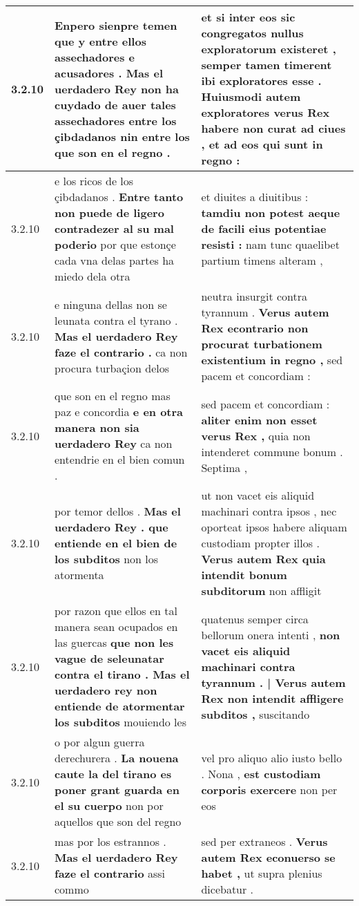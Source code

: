 \begin{tabular}{|p{1cm}|p{6.5cm}|p{6.5cm}|}
3.2.10 & Enpero sienpre temen que y entre ellos assechadores e acusadores . \textbf{ Mas el uerdadero Rey non ha cuydado de auer tales assechadores entre los çibdadanos } nin entre los que son en el regno . & et si inter eos sic congregatos nullus exploratorum existeret , \textbf{ semper tamen timerent ibi exploratores esse . Huiusmodi autem exploratores verus Rex habere non curat ad ciues , } et ad eos qui sunt in regno : \\\hline
3.2.10 & e los ricos de los çibdadanos . \textbf{ Entre tanto non puede de ligero contradezer al su mal poderio } por que estonçe cada vna delas partes ha miedo dela otra & et diuites a diuitibus : \textbf{ tamdiu non potest aeque de facili eius potentiae resisti : } nam tunc quaelibet partium timens alteram , \\\hline
3.2.10 & e ninguna dellas non se leunata contra el tyrano . \textbf{ Mas el uerdadero Rey faze el contrario . } ca non procura turbaçion delos & neutra insurgit contra tyrannum . \textbf{ Verus autem Rex econtrario non procurat turbationem existentium in regno , } sed pacem et concordiam : \\\hline
3.2.10 & que son en el regno mas paz e concordia \textbf{ e en otra manera non sia uerdadero Rey } ca non entendrie en el bien comun . & sed pacem et concordiam : \textbf{ aliter enim non esset verus Rex , } quia non intenderet commune bonum . Septima , \\\hline
3.2.10 & por temor dellos . \textbf{ Mas el uerdadero Rey . que entiende en el bien de los subditos } non los atormenta & ut non vacet eis aliquid machinari contra ipsos , nec oporteat ipsos habere aliquam custodiam propter illos . \textbf{ Verus autem Rex quia intendit bonum subditorum } non affligit \\\hline
3.2.10 & por razon que ellos en tal manera sean ocupados en las guercas \textbf{ que non les vague de seleunatar contra el tirano . Mas el uerdadero rey non entiende de atormentar los subditos } mouiendo les & quatenus semper circa bellorum onera intenti , \textbf{ non vacet eis aliquid machinari contra tyrannum . | Verus autem Rex non intendit affligere subditos , } suscitando \\\hline
3.2.10 & o por algun guerra derechurera . \textbf{ La nouena caute la del tirano es poner grant guarda en el su cuerpo } non por aquellos que son del regno & vel pro aliquo alio iusto bello . Nona , \textbf{ est custodiam corporis exercere } non per eos \\\hline
3.2.10 & mas por los estrannos . \textbf{ Mas el uerdadero Rey faze el contrario } assi commo & sed per extraneos . \textbf{ Verus autem Rex econuerso se habet , } ut supra plenius dicebatur . \\\hline

\end{tabular}
